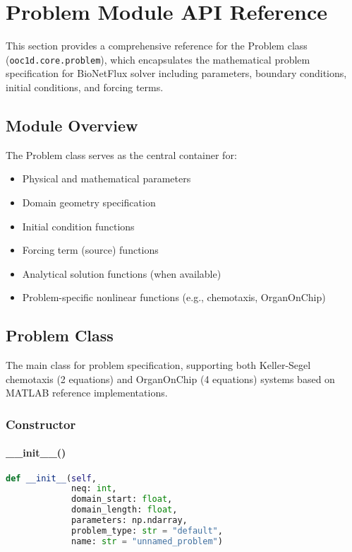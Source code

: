 %

\section{Problem Module API Reference}
\label{sec:problem_module_api}

This section provides a comprehensive reference for the Problem class (\texttt{ooc1d.core.problem}), which encapsulates the mathematical problem specification for BioNetFlux solver including parameters, boundary conditions, initial conditions, and forcing terms.

\subsection{Module Overview}

The Problem class serves as the central container for:
\begin{itemize}
    \item Physical and mathematical parameters
    \item Domain geometry specification
    \item Initial condition functions
    \item Forcing term (source) functions
    \item Analytical solution functions (when available)
    \item Problem-specific nonlinear functions (e.g., chemotaxis, OrganOnChip)
\end{itemize}

\subsection{Problem Class}
\label{subsec:problem_class}

The main class for problem specification, supporting both Keller-Segel chemotaxis (2 equations) and OrganOnChip (4 equations) systems based on MATLAB reference implementations.

\subsubsection{Constructor}

\paragraph{\_\_init\_\_()}
\begin{lstlisting}[language=Python, caption=Problem Constructor]
def __init__(self, 
             neq: int,
             domain_start: float,
             domain_length: float,
             parameters: np.ndarray,
             problem_type: str = "default",
             name: str = "unnamed_problem")
\end{lstlisting}


